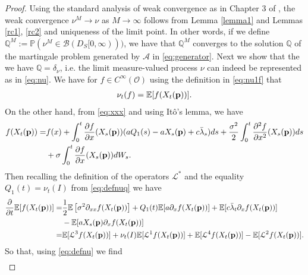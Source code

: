 \documentclass[10pt]{article}
\theoremstyle{plain}
\theoremstyle{definition}
\newcommand{\<}{\langle}
\renewcommand{\>}{\rangle}
\renewcommand{\(}{\left(}
\renewcommand{\)}{\right)}
\renewcommand{\[}{\left[}
\renewcommand{\]}{\right]}
\newcommand{\blu}[1]{\textcolor{blue}{#1}}
\begin{document}
\begin{proof}
Using the standard analysis of weak convergence as in Chapter 3 of \citet{ethier86}, the weak convergence $\nu^M\rightarrow \nu$ as $M\rightarrow \infty$ follows from Lemma \ref{lemma1} and Lemmas \ref{rc1}, \ref{rc2} and uniqueness of the limit point. 
In other words, if we define $\mathbb{Q}^M:=\mathbb{P}(\nu^M\in \mathcal{B}(D_S[0,\infty)))$, %
we have that $\mathbb{Q}^M$
converges to the solution $\mathbb{Q}$ of the martingale problem generated by $\mathcal{A}$ in
\eqref{eq:generator}. Next we show that the we have $\mathbb{Q}=\delta_\nu$, i.e. the limit
measure-valued process $\nu$ can indeed be represented as in \eqref{eq:nu}.  We have for $f\in
C^\infty(\mathcal{O})$ using the definition in \eqref{eq:nu1f} that
\begin{align}\label{eq:defnu}
\nu_t(f)=\mathbb{E}[f(X_t(\bold{p}))].
\end{align}
On the other hand, from \eqref{eq:xxx} and using It\^o's lemma, we have
\begin{align}
f(X_t(\bold{p}))=&f(x)+\int_0^t\frac{\partial f}{\partial
x}(X_s(\bold{p}))(aQ_1(s)-aX_s(\bold{p})+c\bar\lambda_s)ds+\frac{\sigma^2}{2}\int_0^t\frac{\partial
^2f}{\partial x^2}(X_s(\bold{p}))ds\\ &+\sigma\int_0^t\frac{\partial f}{\partial
x}(X_s(\bold{p}))dW_s.
\end{align}
Then recalling the definition of the operators $\mathcal{L}^*$ and the equality $Q_1(t)=\nu_t(I)$ from \eqref{eq:defnuq} we have %
\begin{align}
\frac{\partial}{\partial t}\mathbb{E}[f(X_t(\bold{p}))]=&\frac{1}{2}\mathbb{E}\left[\sigma^2\partial_{xx}f(X_t(\bold{p}))\right]+Q_1(t)\mathbb{E}[a\partial_xf(X_t(\bold{p}))]+\mathbb{E}[c\bar\lambda_t\partial_xf(X_t(\bold{p}))]\\
&-\mathbb{E}[aX_s(\bold{p})\partial_xf(X_t(\bold{p}))]\\
=&\mathbb{E}[\mathcal{L}^3f(X_t(\bold{p}))]+\nu_t(I)\mathbb{E}[\mathcal{L}^1f(X_t(\bold{p}))]+\mathbb{E}[\mathcal{L}^4f(X_t(\bold{p}))]-\mathbb{E}[\mathcal{L}^2f(X_t(\bold{p}))].
\end{align}
So that, using \eqref{eq:defnu} we find
\begin{align}

\end{align}
\end{proof}
\end{document}
